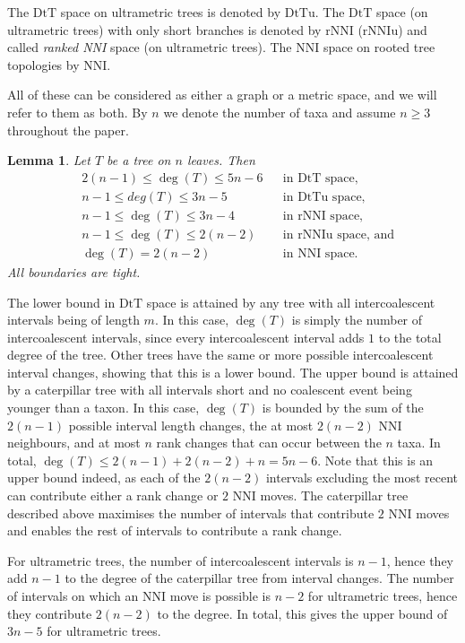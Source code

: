 \documentclass{amsart}
\newtheorem{lemma}{Lemma}
\newcommand{\nni}{\mathrm{NNI}}
\newcommand{\rnni}{\mathrm{rNNI}}
\newcommand{\rnniu}{\mathrm{rNNIu}}
\newcommand{\mdts}{\mathrm{DtT}}
\newcommand{\mdtsu}{\mathrm{DtTu}}
\begin{document}
The $\mdts$ space on ultrametric trees is denoted by $\mdtsu$.
The $\mdts$ space (on ultrametric trees) with only short branches is denoted by $\rnni$ ($\rnniu$) and called {\em ranked NNI} space (on ultrametric trees).
The NNI space on rooted tree topologies by $\nni$.

All of these can be considered as either a graph or a metric space, and we will refer to them as both.
By $n$ we denote the number of taxa and assume $n \geq 3$ throughout the paper.

\begin{lemma}\label{neighBound}
Let $T$ be a tree on $n$ leaves.
Then
\begin{align*}
& 2(n-1) \leq \deg(T) \leq 5n-6 	&&	\mbox{in $\mdts$ space,}\\
& n-1 \leq deg(T) \leq 3n-5		&&	\mbox{in $\mdtsu$ space,}\\
& n-1\leq \deg(T) \leq3n-4 		&&	\mbox{in $\rnni$ space,}\\
& n-1 \leq \deg(T) \leq 2(n-2) 	&&	\mbox{in $\rnniu$ space, and}\\
& \deg(T) = 2(n-2) 			&&	\mbox{in $\nni$ space.}
\end{align*}
All boundaries are tight.
\end{lemma}

\proof
The lower bound in $\mdts$ space is attained by any tree with all intercoalescent intervals being of length $m$.
In this case, $\deg(T)$ is simply the number of intercoalescent intervals, since every intercoalescent interval adds $1$ to the total degree of the tree.
Other trees have the same or more possible intercoalescent interval changes, showing that this is a lower bound.
The upper bound is attained by a caterpillar tree with all intervals short and no coalescent event being younger than a taxon.
In this case, $\deg(T)$ is bounded by the sum of the $2(n-1)$ possible interval length changes, the at most $2(n-2)$ NNI neighbours, and at most $n$ rank changes that can occur between the $n$ taxa.
In total, $\deg(T) \le 2(n-1) + 2(n-2) + n = 5n-6$.
Note that this is an upper bound indeed, as each of the $2(n-2)$ intervals excluding the most recent can contribute either a rank change or $2$ NNI moves.
The caterpillar tree described above maximises the number of intervals that contribute $2$ NNI moves and enables the rest of intervals to contribute a rank change.

For ultrametric trees, the number of intercoalescent intervals is $n-1$, hence they add $n-1$ to the degree of the caterpillar tree from interval changes.
The number of intervals on which an NNI move is possible is $n-2$ for ultrametric trees, hence they contribute $2(n-2)$ to the degree.
In total, this gives the upper bound of $3n-5$ for ultrametric trees.
\end{document}
